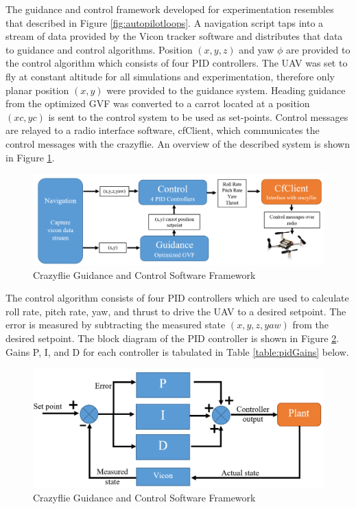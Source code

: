 \documentclass[numbered,pdftex]{ohio-etd}
\begin{document}
The guidance and control framework developed for experimentation resembles that described in Figure \ref{fig:autopilotloops}. A navigation script taps into a stream of data provided by the Vicon tracker software and distributes that data to guidance and control algorithms. Position $(x,y,z)$ and yaw $\phi$ are provided to the control algorithm which consists of four PID controllers. The UAV was set to fly at constant altitude for all simulations and experimentation, therefore only planar position $(x,y)$ were provided to the guidance system. Heading guidance from the optimized GVF was converted to a carrot located at a position $(xc,yc)$ is sent to the control system to be used as set-points. Control messages are relayed to a radio interface software, cfClient, which communicates the control messages with the crazyflie. An overview of the described system is shown in Figure \ref{fig:cfControlClass}.

\begin{figure}[H]
	\centering
	\includegraphics[trim=0 0 1 0,clip,width=14cm]{PaperFigures/Methods/cfControlClass}
	\caption{Crazyflie Guidance and Control Software Framework}
	\label{fig:cfControlClass}
\end{figure}

The control algorithm consists of four PID controllers which are used to calculate roll rate, pitch rate, yaw, and thrust to drive the UAV to a desired setpoint. The error is measured by subtracting the measured state $(x,y,z,yaw)$ from the desired setpoint. The block diagram of the PID controller is shown in Figure \ref{fig:pid}. Gains P, I, and D for each controller is tabulated in Table \ref{table:pidGains} below. 



\begin{figure}[H]
	\centering
	\includegraphics[trim=0 0 0 0,clip,width=14cm]{PaperFigures/Methods/pid}
	\caption{Crazyflie Guidance and Control Software Framework}
	\label{fig:pid}
\end{figure}
\end{document}
